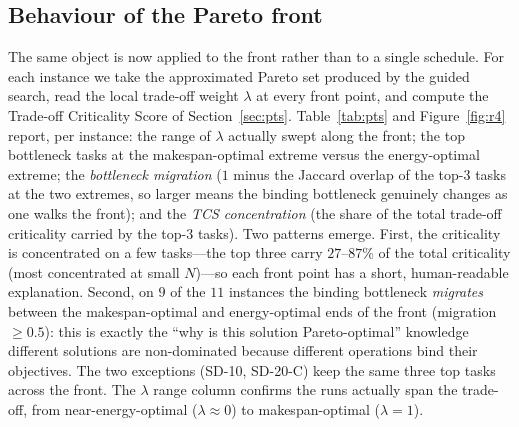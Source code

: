 \documentclass[11pt]{article}
\begin{document}
\subsection{Behaviour of the Pareto front}
\label{sec:front}
The same object is now applied to the front rather than to a single schedule.
For each instance we take the approximated Pareto set produced by the guided search, read
the local trade-off weight $\lambda$ at every front point, and compute the Trade-off Criticality
Score of Section~\ref{sec:pts}. Table~\ref{tab:pts} and Figure~\ref{fig:r4} report, per
instance: the range of
$\lambda$ actually swept along the front; the top bottleneck tasks at the
makespan-optimal extreme versus the energy-optimal extreme; the \emph{bottleneck migration}
($1$ minus the Jaccard overlap of the top-$3$ tasks at the two extremes, so larger means the
binding bottleneck genuinely changes as one walks the front); and the \emph{TCS
concentration} (the share of the total trade-off criticality carried by the top-$3$ tasks). Two patterns
emerge. First, the criticality is concentrated on a few tasks---the top three carry
$27$--$87\%$ of the total criticality (most concentrated at small $N$)---so each front point has
a short, human-readable explanation. Second, on $9$ of the $11$ instances the binding
bottleneck \emph{migrates} between the makespan-optimal and energy-optimal ends of the front
(migration $\ge 0.5$): this is exactly the ``why is this solution Pareto-optimal'' knowledge
different solutions are non-dominated because different operations
bind their objectives. The two exceptions (\textsf{SD-10}, \textsf{SD-20-C}) keep the same
three top tasks across the front. The $\lambda$ range column confirms the runs actually span
the trade-off, from near-energy-optimal ($\lambda\!\approx\!0$) to makespan-optimal
($\lambda\!=\!1$).
\end{document}
